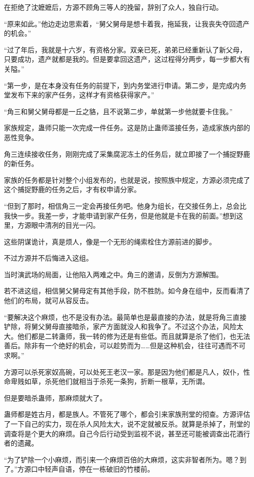 \begin{this_body}
在拒绝了沈嬷嬷后，方源不顾角三等人的挽留，辞别了众人，独自行动。

“原来如此。”他边走边思索着，“舅父舅母是想卡着我，拖延我，让我丧失夺回遗产的机会。”

“过了年后，我就是十六岁，有资格分家。双亲已死，弟弟已经重新认了新父母，只要成功，遗产就都是我的。但是要拿回这遗产，这过程得分两步，每一步都大有关隘。”

“第一步，是在本身没有任务的前提下，到内务堂进行申请。第二步，是完成内务堂发布下来的家产任务，这样才有资格获得家产。”

“角三和舅父舅母都是一丘之貉，且不说第二步，单就第一步他就要卡住我。”

家族规定，蛊师只能一次完成一件任务。这是防止蛊师滥接任务，造成家族内部的恶性竞争。

角三连续接收任务，刚刚完成了采集腐泥冻土的任务后，就立即接了一个捕捉野鹿的新任务。

家族的任务都是针对整个小组发布的，也就是说，按照族中规定，方源必须完成了这个捕捉野鹿的任务之后，才有权申请分家。

“但到了那时，相信角三一定会再接任务吧。他身为组长，在交接任务上，总会比我快一步。我差一步，才能申请到家产任务，但是他就是卡在我的前面。”想到这里，方源眼中清冽的目光一闪。

这些阴谋诡计，真是烦人，像是一个无形的绳索栓住方源前进的脚步。

不过方源并不后悔进入这组。

当时演武场的局面，让他陷入两难之中。角三的邀请，反倒为方源解围。

若不进这组，相信舅父舅母定有其他手段，防不胜防。如今身在组中，反而看清了他们的布局，就可从容反击。

“要解决这个麻烦，也不是没有办法。最简单也是最直接的办法，就是将角三直接铲除，将舅父舅母直接暗杀，家产方面就没人和我争了。不过这个办法，风险太大。他们都是二转蛊师，我一转的修为还是有些低。而且就算是杀了他们，也无法善后。除非有一个绝好的机会，可以趁势而为……但是这种机会，往往可遇而不可求啊。”

方源可以杀死家奴高碗，可以处死王老汉一家。那是因为他们都是凡人，奴仆，性命卑贱如草，杀死他们就相当于杀死一条狗，折断一根草，无所谓。

但是要暗杀蛊师，那麻烦就大了。

蛊师都是姓古月，都是族人。不管死了哪个，都会引来家族刑堂的彻查。方源评估了一下自己的实力，现在杀人风险太大，说不定就被反杀。就算是杀掉了，刑堂的调查将是个更大的麻烦。自己今后行动受到监视不说，甚至还可能被调查出花酒行者的遗藏。

“为了铲除一个小麻烦，而引来一个麻烦百倍的大麻烦，这实非智者所为。嗯？到了。”方源口中轻声自语，停在一栋破旧的竹楼前。


\end{this_body}
